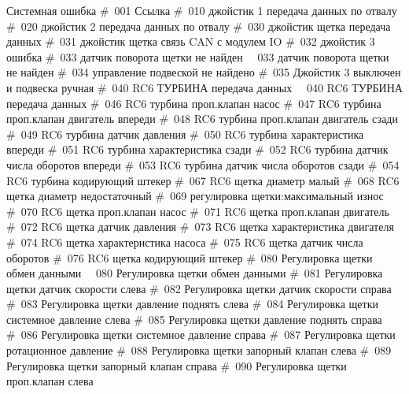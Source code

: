  {Системная ошибка}
 {\#\ 001 Ссылка}
 {\#\ 010 джойстик 1 передача данных по отвалу}
 {\#\ 020 джойстик 2 передача данных по отвалу}
 {\#\ 030 джойстик щетка передача данных}
 {\#\ 031 джойстик щетка связь CAN с модулем IO}
 {\#\ 032 джойстик 3 ошибка}
 {\#\ 033 датчик поворота щетки не найден}
 {\ \ 033 датчик поворота щетки не найден}
 {\#\ 034 управление подвеской не найдено}
 {\#\ 035 Джойстик 3 выключен и подвеска ручная}
 {\#\ 040 RC6 ТУРБИНА передача данных}
 {\ \ 040 RC6 ТУРБИНА передача данных}
 {\#\ 046 RC6 турбина проп.клапан насос}
 {\#\ 047 RC6 турбина проп.клапан двигатель впереди}
 {\#\ 048 RC6 турбина проп.клапан двигатель сзади}
 {\#\ 049 RC6 турбина датчик давления}
 {\#\ 050 RC6 турбина характеристика впереди}
 {\#\ 051 RC6 турбина характеристика сзади}
 {\#\ 052 RC6 турбина датчик числа оборотов впереди}
 {\#\ 053 RC6 турбина датчик числа оборотов сзади}
 {\#\ 054 RC6 турбина кодирующий штекер}
 {\#\ 067 RC6 щетка диаметр малый}
 {\#\ 068 RC6 щетка диаметр недостаточный}
 {\#\ 069 регулировка щетки:максимальный износ}
 {\#\ 070 RC6 щетка проп.клапан насос}
 {\#\ 071 RC6 щетка проп.клапан двигатель}
 {\#\ 072 RC6 щетка датчик давления}
 {\#\ 073 RC6 щетка характеристика двигателя}
 {\#\ 074 RC6 щетка характеристика насоса}
 {\#\ 075 RC6 щетка датчик числа оборотов}
 {\#\ 076 RC6 щетка кодирующий штекер}
 {\#\ 080 Регулировка щетки обмен данными}
 {\ \ 080 Регулировка щетки обмен данными}
 {\#\ 081 Регулировка щетки датчик скорости слева}
 {\#\ 082 Регулировка щетки датчик скорости справа}
 {\#\ 083 Регулировка щетки давление поднять слева}
 {\#\ 084 Регулировка щетки системное давление слева}
 {\#\ 085 Регулировка щетки давление поднять справа}
 {\#\ 086 Регулировка щетки системное давление справа}
 {\#\ 087 Регулировка щетки ротационное давление}
 {\#\ 088 Регулировка щетки запорный клапан слева}
 {\#\ 089 Регулировка щетки запорный клапан справа}
 {\#\ 090 Регулировка щетки проп.клапан слева}
